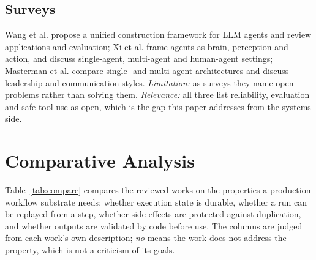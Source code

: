 \documentclass[conference]{IEEEtran}
\begin{document}
\subsection{Surveys}
Wang et al. \cite{wang2024survey} propose a unified construction framework for LLM agents and review applications and evaluation; Xi et al. \cite{xi2023rise} frame agents as brain, perception and action, and discuss single-agent, multi-agent and human-agent settings; Masterman et al. \cite{masterman2024landscape} compare single- and multi-agent architectures and discuss leadership and communication styles. \emph{Limitation:} as surveys they name open problems rather than solving them. \emph{Relevance:} all three list reliability, evaluation and safe tool use as open, which is the gap this paper addresses from the systems side.

\section{Comparative Analysis}
Table~\ref{tab:compare} compares the reviewed works on the properties a production workflow substrate needs: whether execution state is durable, whether a run can be replayed from a step, whether side effects are protected against duplication, and whether outputs are validated by code before use. The columns are judged from each work's own description; \emph{no} means the work does not address the property, which is not a criticism of its goals.
\end{document}
